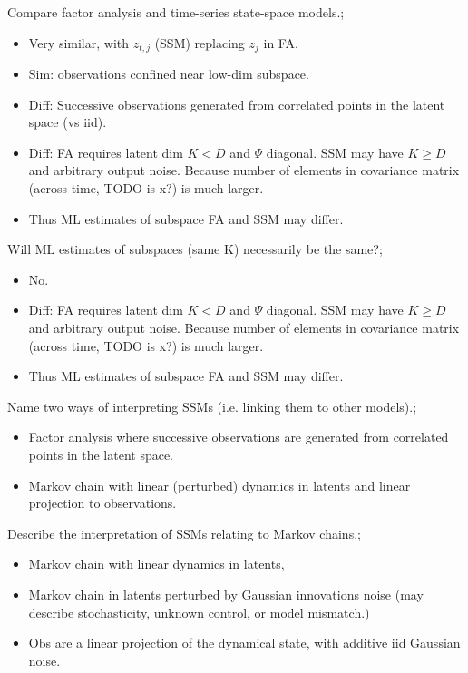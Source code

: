 \documentclass{article}
\begin{document}
Compare factor analysis and time-series state-space models.; \begin{itemize} \item Very similar, with $z_{t,j}$ (SSM) replacing $z_j$ in FA.  \item Sim: observations confined near low-dim subspace.  \item Diff: Successive observations generated from correlated points in the latent space (vs iid).  \item Diff: FA requires latent dim $K<D$ and $\Psi$ diagonal. SSM may have $K\geq D$ and arbitrary output noise. Because number of elements in covariance matrix (across time, TODO is x?) is much larger.  \item Thus ML estimates of subspace FA and SSM may differ.  \end{itemize}

Will ML estimates of subspaces (same K) necessarily be the same?; \begin{itemize} \item No.  \item Diff: FA requires latent dim $K<D$ and $\Psi$ diagonal. SSM may have $K\geq D$ and arbitrary output noise. Because number of elements in covariance matrix (across time, TODO is x?) is much larger.  \item Thus ML estimates of subspace FA and SSM may differ.  \end{itemize} 

Name two ways of interpreting SSMs (i.e. linking them to other models).; \begin{itemize} \item Factor analysis where successive observations are generated from correlated points in the latent space.  \item Markov chain with linear (perturbed) dynamics in latents and linear projection to observations.  \end{itemize}

Describe the interpretation of SSMs relating to Markov chains.; \begin{itemize} \item Markov chain with linear dynamics in latents, \item Markov chain in latents perturbed by Gaussian innovations noise (may describe stochasticity, unknown control, or model mismatch.) \item Obs are a linear projection of the dynamical state, with additive iid Gaussian noise.  \end{itemize}
\end{document}
